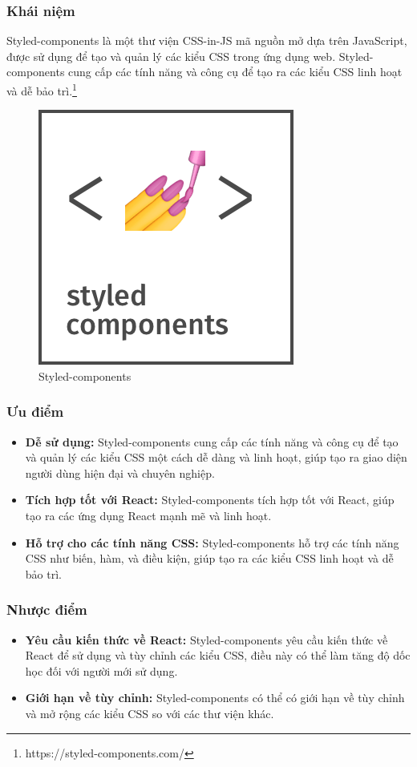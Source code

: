 \subsubsection{Khái niệm}
\noindent Styled-components là một thư viện CSS-in-JS mã nguồn mở dựa trên JavaScript, được sử dụng để tạo và quản lý các kiểu CSS trong ứng dụng web. Styled-components cung cấp các tính năng và công cụ để tạo ra các kiểu CSS linh hoạt và dễ bảo trì.\footnote{https://styled-components.com/}
\begin{figure}[H]
  \begin{center}
    \includegraphics[scale=0.35]{images/hieu/phuluc/styled-components.png}
    \caption{Styled-components}
  \end{center}
\end{figure}
\subsubsection{Ưu điểm}
\begin{itemize}
  \item \textbf{Dễ sử dụng:} Styled-components cung cấp các tính năng và công cụ để tạo và quản lý các kiểu CSS một cách dễ dàng và linh hoạt, giúp tạo ra giao diện người dùng hiện đại và chuyên nghiệp.
  \item \textbf{Tích hợp tốt với React:} Styled-components tích hợp tốt với React, giúp tạo ra các ứng dụng React mạnh mẽ và linh hoạt.
  \item \textbf{Hỗ trợ cho các tính năng CSS:} Styled-components hỗ trợ các tính năng CSS như biến, hàm, và điều kiện, giúp tạo ra các kiểu CSS linh hoạt và dễ bảo trì.
\end{itemize}
\subsubsection{Nhược điểm}
\begin{itemize}
  \item \textbf{Yêu cầu kiến thức về React:} Styled-components yêu cầu kiến thức về React để sử dụng và tùy chỉnh các kiểu CSS, điều này có thể làm tăng độ dốc học đối với người mới sử dụng.
  \item \textbf{Giới hạn về tùy chỉnh:} Styled-components có thể có giới hạn về tùy chỉnh và mở rộng các kiểu CSS so với các thư viện khác.
\end{itemize}
